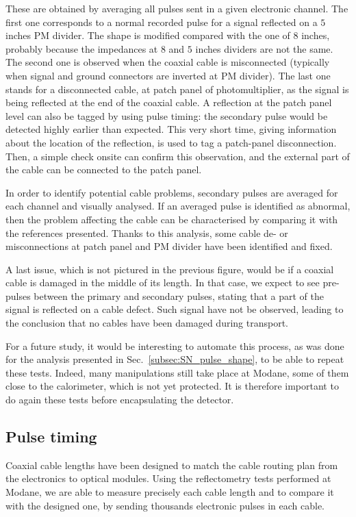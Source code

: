 These are obtained by averaging all pulses sent in a given electronic channel.
The first one corresponds to a normal recorded pulse for a signal reflected on a $5$ inches PM divider.
The shape is modified compared with the one of $8$ inches, probably because the impedances at $8$ and $5$ inches dividers are not the same.
The second one is observed when the coaxial cable is misconnected (typically when signal and ground connectors are inverted at PM divider).
The last one stands for a disconnected cable, at patch panel of photomultiplier, as the signal is being reflected at the end of the coaxial cable.
A reflection at the patch panel level can also be tagged by using pulse timing: the secondary pulse would be detected highly earlier than expected.
This very short time, giving information about the location of the reflection, is used to tag a patch-panel disconnection.
Then, a simple check onsite can confirm this observation, and the external part of the cable can be connected to the patch panel.

In order to identify potential cable problems, secondary pulses are averaged for each channel and visually analysed.
If an averaged pulse is identified as abnormal, then the problem affecting the cable can be characterised by comparing it with the references presented.
Thanks to this analysis, some cable de- or misconnections at patch panel and PM divider have been identified and fixed.

A last issue, which is not pictured in the previous figure, would be if a coaxial cable is damaged in the middle of its length.
In that case, we expect to see pre-pulses between the primary and secondary pulses, stating that a part of the signal is reflected on a cable defect.
Such signal have not be observed, leading to the conclusion that no cables have been damaged during transport.

For a future study, it would be interesting to automate this process, as was done for the analysis presented in Sec.~\ref{subsec:SN_pulse_shape}, to be able to repeat these tests.
Indeed, many manipulations still take place at Modane, some of them close to the calorimeter, which is not yet protected.
It is therefore important to do again these tests before encapsulating the detector.

\subsection{Pulse timing}
\label{subsec:timing}

Coaxial cable lengths have been designed to match the cable routing plan from the electronics to optical modules.
Using the reflectometry tests performed at Modane, we are able to measure precisely each cable length and to compare it with the designed one, by sending thousands electronic pulses in each cable.

